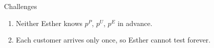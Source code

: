 \begin{frame}{Challenges}
  \begin{center}
  \end{center}

  \smallskip
  \begin{enumerate}\setlength{\itemsep}{0pt}
    \item Neither Esther  knows
          $p^P$, $p^U$, $p^E$ in advance.
    \item Each customer arrives only once, so Esther cannot test forever.
  \end{enumerate}
\end{frame}

